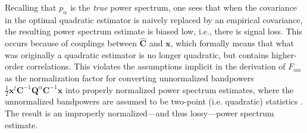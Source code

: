 \documentclass[preprint2,numberedappendix,tighten]{aastex6}  %
\newcommand{\x}{\mathbf{x}}
\newcommand{\C}{\mathbf{C}}
\newcommand{\Q}{\mathbf{Q}}
\begin{document}
Recalling that $p_\alpha$ is the \emph{true} power spectrum, one sees that when the covariance in the optimal quadratic estimator is naively replaced by an empirical covariance, the resulting power spectrum estimate is biased low, i.e., there is signal loss. This occurs because of couplings between $\widehat{\C}$ and $\x$, which formally means that what was originally a quadratic estimator is no longer quadratic, but contains higher-order correlations. This violates the assumptions implicit in the derivation of $F_{\alpha \alpha}$ as the normalization factor for converting unnormalized bandpowers $\frac{1}{2} \x^t \C^{-1} \Q^{\alpha} \C^{-1} \x$ into properly normalized power spectrum estimates, where the unnormalized bandpowers are assumed to be two-point (i.e. quadratic) statistics \citep{liu_tegmark2011}. The result is an improperly normalized---and thus lossy---power spectrum estimate.
\end{document}

